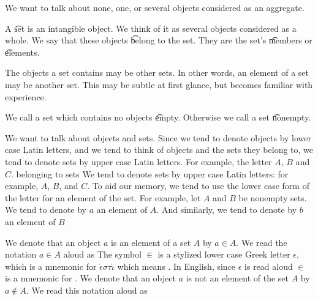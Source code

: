 

We want to talk about none, one, or several objects considered as an aggregate.


A \t{set} is an intangible object.
We think of it as several objects considered as a whole.
We say that these objects \t{belong} to the set.
They are the set's \t{members} or \t{elements}.

The objects a set contains may be other sets.
In other words, an element of a set may be another set.
This may be subtle at first glance, but becomes familiar with experience.

We call a set which contains no objects \t{empty}.
Otherwise we call a set \t{nonempty}.


We want to talk about objects and sets.
Since we tend to denote objects by lower case Latin letters, and we tend to think of objects and the sets they belong to, we tend to denote sets by upper case Latin letters.
For example, the letter $A$, $B$ and $C$.
belonging to sets
We tend to denote sets by upper case Latin letters: for example, $A$, $B$, and $C$.
To aid our memory, we tend to use the lower case form of the letter for an element of the set.
For example, let $A$ and $B$ be nonempty sets.
We tend to denote by $a$ an element of $A$. And similarly, we tend to denote by $b$ an element of $B$

We denote that an object $a$ is an element of a set $A$ by $a \in A$.
We read the notation $a \in A$ aloud as 
The symbol $\in$ is a stylized lower case Greek letter $\epsilon$, which is a mnemonic for $\grave{\epsilon} \sigma \tau \acute{\iota}$ which means .
In English, since $\epsilon$ is read aloud  $\in$ is a mnemonic for .
We denote that an object $a$ is not an element of the set $A$ by $a \not\in A$.
We read this notation aloud as 
%
%

